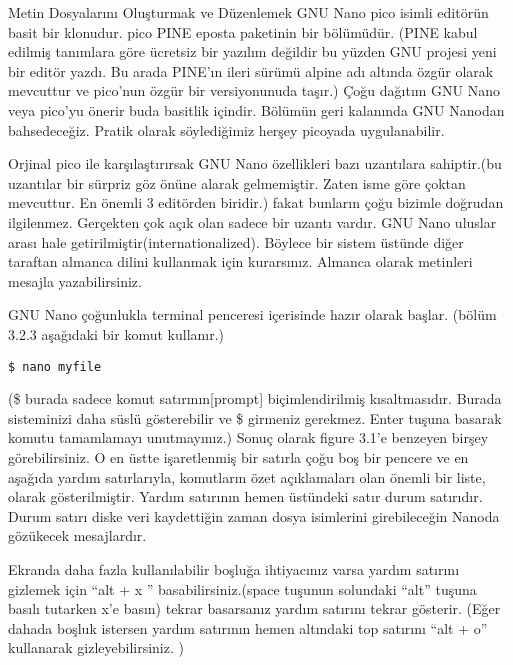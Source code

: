 \begin{section}{Metin Dosyalarını Oluşturmak ve Düzenlemek}
GNU Nano pico isimli editörün basit bir klonudur. pico PINE eposta paketinin bir bölümüdür. (PINE kabul edilmiş tanımlara göre ücretsiz bir yazılım değildir bu yüzden GNU projesi yeni bir editör yazdı. Bu arada PINE’ın ileri sürümü alpine adı altında özgür olarak mevcuttur ve pico’nun özgür bir versiyonunuda taşır.) Çoğu dağıtım GNU Nano veya pico’yu önerir buda basitlik içindir. Bölümün geri kalanında GNU Nanodan bahsedeceğiz. Pratik olarak söylediğimiz herşey picoyada uygulanabilir.

Orjinal pico ile karşılaştırırsak GNU Nano özellikleri bazı uzantılara sahiptir.(bu uzantılar bir sürpriz göz önüne alarak gelmemiştir. Zaten isme göre çoktan mevcuttur. En önemli 3 editörden biridir.) fakat bunların çoğu bizimle doğrudan ilgilenmez. Gerçekten çok açık olan sadece bir uzantı vardır. GNU Nano uluslar arası hale getirilmiştir(internationalized). Böylece bir sistem üstünde diğer taraftan almanca dilini kullanmak için kurarsınız.  Almanca olarak metinleri mesajla yazabilirsiniz.

GNU Nano çoğunlukla terminal penceresi içerisinde hazır olarak başlar. (bölüm 3.2.3 aşağıdaki bir komut kullanır.)

\begin{verbatim}
$ nano myfile
\end{verbatim}

(\$ burada sadece komut satırının[prompt] biçimlendirilmiş kısaltmasıdır. Burada sisteminizi daha süslü gösterebilir ve \$ girmeniz gerekmez. Enter tuşuna basarak komutu tamamlamayı unutmayınız.) Sonuç olarak figure 3.1’e benzeyen birşey görebilirsiniz. O en üstte işaretlenmiş bir satırla çoğu boş bir pencere ve en aşağıda yardım satırlarıyla, komutların özet açıklamaları olan önemli bir liste, olarak gösterilmiştir. Yardım satırının hemen üstündeki satır durum satırıdır. Durum satırı diske veri kaydettiğin zaman dosya isimlerini girebileceğin Nanoda gözükecek mesajlardır. 

Ekranda daha fazla kullanılabilir boşluğa ihtiyacınız varsa yardım satırını gizlemek için “alt + x ” basabilirsiniz.(space tuşunun solundaki “alt” tuşuna basılı tutarken x’e basın) tekrar basarsanız yardım satırını tekrar gösterir. (Eğer dahada boşluk istersen yardım satırının hemen altındaki top satırını “alt + o” kullanarak gizleyebilirsiniz. )


\end{section}
